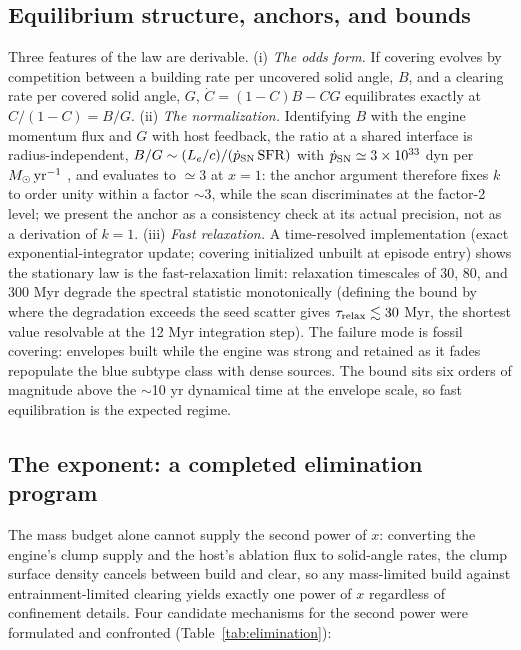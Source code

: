 \documentclass[twocolumn]{aastex631}
\begin{document}
\subsection{Equilibrium structure, anchors, and bounds}\label{sec:equil}
Three features of the law are derivable. (i) \emph{The odds form.} If
covering evolves by competition between a building rate per uncovered
solid angle, $B$, and a clearing rate per covered solid angle, $G$,
$\dot C=(1-C)B-CG$ equilibrates exactly at $C/(1-C)=B/G$. (ii) \emph{The
normalization.} Identifying $B$ with the engine momentum flux and $G$ with
host feedback, the ratio at a shared interface is radius-independent,
$B/G\sim(L_{e}/c)/(\dot p_{\rm SN}\,{\rm SFR})$ with
$\dot p_{\rm SN}\simeq3\times10^{33}$ dyn per $M_{\odot}\,{\rm yr^{-1}}$
\citep{KimOstriker2015}, and evaluates to $\simeq3$ at $x=1$: the anchor
argument therefore fixes $k$ to order unity within a factor $\sim3$, while
the scan discriminates at the factor-2 level; we present the anchor as a
consistency check at its actual precision, not as a derivation of $k=1$.
(iii) \emph{Fast relaxation.} A time-resolved implementation (exact
exponential-integrator update; covering initialized unbuilt at episode
entry) shows the stationary law is the fast-relaxation limit: relaxation
timescales of 30, 80, and 300 Myr degrade the spectral statistic
monotonically (defining the bound by where the degradation exceeds the
seed scatter gives $\tau_{\rm relax}\lesssim30$ Myr, the shortest value
resolvable at the 12 Myr integration step). The failure mode is fossil
covering: envelopes built while the engine was strong and retained as it
fades repopulate the blue subtype class with dense sources. The bound sits
six orders of magnitude above the $\sim$10 yr dynamical time at the
envelope scale, so fast equilibration is the expected regime.

\subsection{The exponent: a completed elimination program}
\label{sec:exponent}
The mass budget alone cannot supply the second power of $x$: converting
the engine's clump supply and the host's ablation flux to solid-angle
rates, the clump surface density cancels between build and clear, so any
mass-limited build against entrainment-limited clearing yields exactly one
power of $x$ regardless of confinement details. Four candidate mechanisms
for the second power were formulated and confronted
(Table~\ref{tab:elimination}):
\end{document}
